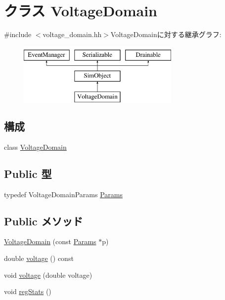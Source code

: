 \hypertarget{classVoltageDomain}{
\section{クラス VoltageDomain}
\label{classVoltageDomain}
}


{\ttfamily \#include $<$voltage\_\-domain.hh$>$}VoltageDomainに対する継承グラフ:\begin{figure}[H]
\begin{center}
\leavevmode
\includegraphics[height=3cm]{classVoltageDomain}
\end{center}
\end{figure}
\subsection*{構成}
\begin{DoxyCompactItemize}
\item 
class \hyperlink{classVoltageDomain_1_1VoltageDomain}{VoltageDomain}
\end{DoxyCompactItemize}
\subsection*{Public 型}
\begin{DoxyCompactItemize}
\item 
typedef VoltageDomainParams \hyperlink{classVoltageDomain_a61186f371a672d43600e7a1741f9b3fa}{Params}
\end{DoxyCompactItemize}
\subsection*{Public メソッド}
\begin{DoxyCompactItemize}
\item 
\hyperlink{classVoltageDomain_afb6675d6012adb00febeff48aef1882a}{VoltageDomain} (const \hyperlink{classVoltageDomain_a61186f371a672d43600e7a1741f9b3fa}{Params} $\ast$p)
\item 
double \hyperlink{classVoltageDomain_a3222f13284739dc636f7f10cd265c66f}{voltage} () const 
\item 
void \hyperlink{classVoltageDomain_af4a3b41d1fba1c88cd46e85fb5e517c1}{voltage} (double voltage)
\item 
void \hyperlink{classVoltageDomain_a4dc637449366fcdfc4e764cdf12d9b11}{regStats} ()
\end{DoxyCompactItemize}
